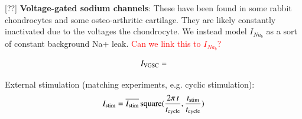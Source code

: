 [??] {\bf Voltage-gated sodium channels}: These have been found in
some rabbit chondrocytes and some osteo-arthritic cartilage. They are
likely constantly inactivated due to the voltages the
chondrocyte.  We instead model $I_{Na_{b}}$ as a sort of constant
background Na+ leak. \textcolor{red}{Can we link this to
  $I_{Na_{b}}$?}

\begin{equation}
  I_{\rm VGSC} =
\end{equation}

External stimulation (matching experiments, e.g. cyclic stimulation):
\begin{equation}
I_{\rm stim} = \overline{I_{\rm stim}}\, {\rm square}(\frac{2 \pi\,
  t}{t_{\rm cycle}}, \frac{t_{\rm stim}}{t_{\rm cycle}})
\end{equation}

